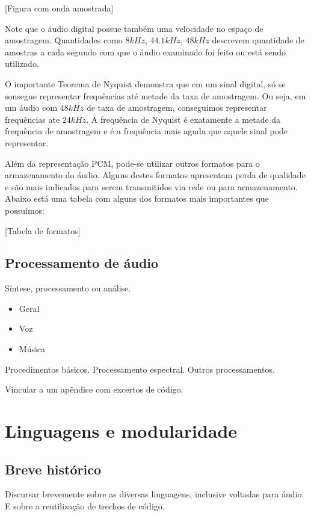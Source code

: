 [Figura com onda amostrada]

Note que o áudio digital possue também uma velocidade no espaço de amostragem.
Quantidades como $8kHz$, $44.1kHz$, $48kHz$
descrevem quantidade de amostras a cada segundo com que o áudio examinado foi feito ou
está sendo utilizado.

O importante Teorema de Nyquist demonstra que em um sinal digital, só se sonsegue representar
frequências até metade da taxa de amostragem. Ou seja, em um áudio com $48kHz$ de taxa de amostragem,
conseguimos representar frequências ate $24kHz$. A frequência de Nyquist é exatamente a metade
da frequência de amostragem e é a frequência mais aguda que aquele sinal pode representar.

Além da representação PCM, pode-se utilizar outros formatos para o armazenamento do áudio. Alguns
destes formatos apresentam perda de qualidade e são mais indicados para serem transmitidos via rede ou
para armazenamento. Abaixo está uma tabela com alguns dos formatos mais importantes que possuímos:

[Tabela de formatos]


\subsection{Processamento de áudio}

Síntese, processamento ou análise.

\begin{itemize}
    \item Geral
    \item Voz
    \item Música
\end{itemize}

Procedimentos básicos. Processamento
espectral. Outros processamentos.

Vincular a um apêndice com excertos de código.

\section{Linguagens e modularidade}

\subsection{Breve histórico}

Discursar brevemente sobre as diversas linguagens,
inclusive voltadas para áudio. E sobre a reutilização
de trechos de código.

